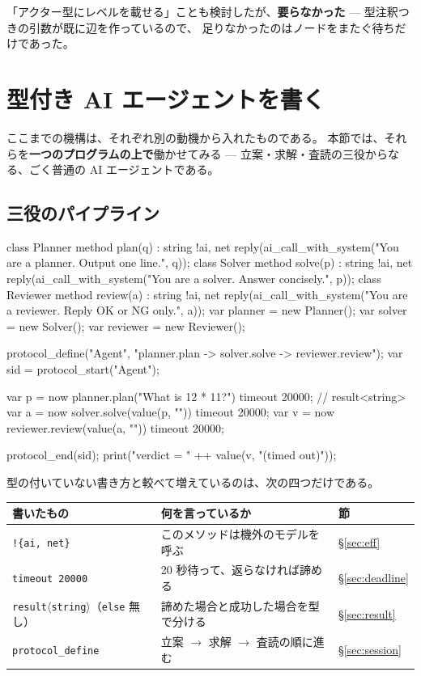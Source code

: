 \documentclass[11pt,a4paper]{ltjsarticle}
\theoremstyle{definition}
\theoremstyle{remark}
\begin{document}
「アクター型にレベルを載せる」ことも検討したが、\textbf{要らなかった} ---
型注釈つきの引数が既に辺を作っているので、
足りなかったのはノードをまたぐ待ちだけであった。


\section{型付き AI エージェントを書く}
\label{sec:agent}

ここまでの機構は、それぞれ別の動機から入れたものである。
本節では、それらを\textbf{一つのプログラムの上で}働かせてみる ---
立案・求解・査読の三役からなる、ごく普通の AI エージェントである。

\subsection{三役のパイプライン}

\begin{aipl}
class Planner {
  method plan(q) : string !{ai, net} {
    reply(ai_call_with_system("You are a planner. Output one line.", q));
  }
}
class Solver {
  method solve(p) : string !{ai, net} {
    reply(ai_call_with_system("You are a solver. Answer concisely.", p));
  }
}
class Reviewer {
  method review(a) : string !{ai, net} {
    reply(ai_call_with_system("You are a reviewer. Reply OK or NG only.", a));
  }
}
var planner  = new Planner();
var solver   = new Solver();
var reviewer = new Reviewer();

protocol_define("Agent", "planner.plan -> solver.solve -> reviewer.review");
var sid = protocol_start("Agent");

var p = now planner.plan("What is 12 * 11?") timeout 20000;   // result<string>
var a = now solver.solve(value(p, "")) timeout 20000;
var v = now reviewer.review(value(a, "")) timeout 20000;

protocol_end(sid);
print("verdict = " ++ value(v, "(timed out)"));
\end{aipl}

型の付いていない書き方と較べて増えているのは、次の四つだけである。

\begin{center}
\begin{tabular}{lll}
\toprule
書いたもの & 何を言っているか & 節 \\
\midrule
\texttt{!\{ai, net\}} & このメソッドは機外のモデルを呼ぶ & \S\ref{sec:eff} \\
\texttt{timeout 20000} & 20 秒待って、返らなければ諦める & \S\ref{sec:deadline} \\
\texttt{result}$\langle$\texttt{string}$\rangle$（\texttt{else} 無し） & 諦めた場合と成功した場合を型で分ける & \S\ref{sec:result} \\
\texttt{protocol\_define} & 立案 $\to$ 求解 $\to$ 査読の順に進む & \S\ref{sec:session} \\
\bottomrule
\end{tabular}
\end{center}
\end{document}
